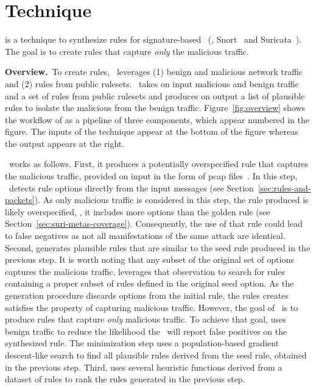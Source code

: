 \documentclass[sigconf,review, anonymous]{acmart}
\begin{document}
\section{Technique}
\label{sec:technique}

\tname{} is a technique to synthesize rules for signature-based
\nids~(\eg{}, Snort~\cite{snort} and Suricata~\cite{suricata}). The
goal is to create rules that capture \emph{only} the
malicious traffic.

\vspace{1ex}
\noindent\textbf{Overview.}~To create rules, \tname\ leverages (1)
benign and malicious network traffic and (2) rules from public
rulesets. \tname\ takes on input malicious and benign traffic and a
set of rules from public rulesets and produces on output a list of
plausible rules to isolate the malicious from the benign
traffic. Figure~\ref{fig:overview} shows the workflow of \tname{} as a
pipeline of three components, which appear numbered in the figure.
The inputs of the technique appear at the bottom of the figure whereas
the output appears at the right.

\tname\ works as follows. First, it produces a potentially
overspecified rule that captures the malicious traffic, provided on
input in the form of pcap files~\cite{pcap}. In this step,
\tname\ detects rule options directly from the input messages (see
Section~\ref{sec:rules-and-packets}). As only malicious traffic is
considered in this step, the rule produced is likely overspecified,
\ie{}, it includes more options than the golden rule (see
Section~\ref{sec:suri-metas-coverage}). Consequently, the use of that
rule could lead to false negatives as not all manifestations of the
same attack are identical. Second, \tname{} generates plausible rules
that are similar to the seed rule produced in the previous step. It is
worth noting that any subset of the original set of options captures
the malicious traffic. \tname{} leverages that observation to search
for rules containing a proper subset of rules defined in the original
seed option. As the generation procedure discards options from the
initial rule, the rules \tname{} creates satisfies the property of
capturing malicious traffic. However, the goal of \tname\ is to
produce rules that capture \emph{only} malicious traffic. To achieve
that goal, \tname{} uses benign traffic to reduce the likelihood the
\nids\ will report false positives on the synthesized rule. The
minimization step uses a population-based gradient descent-like search
to find all plausible rules derived from the seed rule, obtained in
the previous step. Third, \tname{} uses several heuristic functions
derived from a dataset of rules to rank the rules generated in the
previous step.
\end{document}

